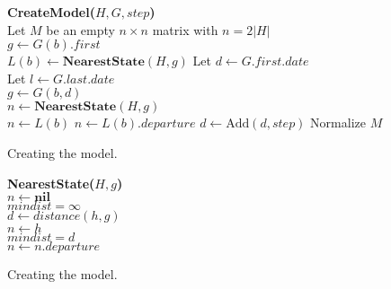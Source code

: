 \begin{algorithm}
\SetAlgoNoEnd
\textbf{CreateModel($H, G, step$)}\\
Let $M$ be an empty $n \times n$ matrix with $n = 2|H|$ \\
	{
	$g \leftarrow G(b).first$\\
	$L(b) \leftarrow
	 \textbf{NearestState}(H, g)$
	}
Let $d \leftarrow G.first.date$\\
Let $l \leftarrow G.last.date$\\
	{
		{
		$g \leftarrow G(b, d)$\\
		$n \leftarrow \textbf{NearestState}(H, g)$\\
			{
			$n \leftarrow L(b)$
			}
			{
			$n \leftarrow L(b).departure$
			}
		}
	$d \leftarrow \text{Add}(d, step)$
	}
Normalize $M$\\
\caption{Creating the model.}
\label{markov:alg:create_model}
\end{algorithm}

\begin{algorithm}
\SetAlgoNoEnd
\textbf{NearestState($H, g$)}\\
$n \leftarrow \textbf{nil}$\\
$mindist = \infty$\\
	{
	$d \leftarrow distance(h, g)$\\
		{
		$n \leftarrow h$\\
		$mindist = d$\\
		}
	}
	{
	$n \leftarrow n.departure$
	}
\caption{Creating the model.}
\label{markov:alg:nearest}
\end{algorithm}